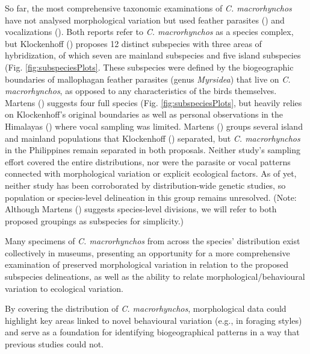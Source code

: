 \documentclass[10pt,a4paper]{article}
\begin{document}
So far, the most comprehensive taxonomic examinations of \emph{C. macrorhynchos} have not analysed morphological variation but used feather parasites () and vocalizations ().
Both reports refer to \emph{C. macrorhynchos} as a species complex, but Klockenhoff () proposes 12 distinct subspecies with three areas of hybridization, of which seven are mainland subspecies and five island subspecies (Fig. \ref{fig:subspeciesPlots}.
These subspecies were defined by the biogeographic boundaries of mallophagan feather parasites (genus \emph{Myrsidea}) that live on \emph{C. macrorhynchos}, as opposed to any characteristics of the birds themselves.
Martens () suggests four full species (Fig. \ref{fig:subspeciesPlots}, but heavily relies on Klockenhoff's original boundaries as well as personal observations in the Himalayas () where vocal sampling was limited.
Martens () groups several island and mainland populations that Klockenhoff () separated, but \emph{C. macrorhynchos} in the Philippines remain separated in both proposals.
Neither study's sampling effort covered the entire distributions, nor were the parasite or vocal patterns connected with morphological variation or explicit ecological factors.
As of yet, neither study has been corroborated by distribution-wide genetic studies, so population or species-level delineation in this group remains unresolved.
(Note: Although Martens () suggests species-level divisions, we will refer to both proposed groupings as subspecies for simplicity.)

Many specimens of \emph{C. macrorhynchos} from across the species' distribution exist collectively in museums, presenting an opportunity for a more comprehensive examination of preserved morphological variation in relation to the proposed subspecies delineations, as well as the ability to relate morphological/behavioural variation to ecological variation.

By covering the distribution of \emph{C. macrorhynchos}, morphological data could highlight key areas linked to novel behavioural variation (e.g., in foraging styles) and serve as a foundation for identifying biogeographical patterns in a way that previous studies could not.
\end{document}

